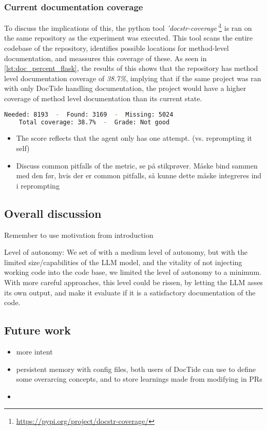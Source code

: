 \subsubsection*{Current documentation coverage}
To discuss the implications of this, the python tool \textit{'docstr-coverage'}\footnote{\url{https://pypi.org/project/docstr-coverage/}} is ran on the same repository as the experiment was executed. This tool scans the entire codebase of the repository, identifies possible locations for method-level documentation, and meassures this coverage of these. As seen in \cref{lst:doc_percent_flask}, the results of this shows that the repository has method level documentation coverage of \textit{38.7\%}, implying that if the same project was ran with only DocTide handling documentation, the project would have a higher coverage of method level documentation than its current state.

\begin{lstlisting}[language=sh, label={lst:doc_percent_flask},      caption= Ratio of method level documentation in flask repository]
    Needed: 8193  -  Found: 3169  -  Missing: 5024
    Total coverage: 38.7%  -  Grade: Not good
\end{lstlisting}
\begin{itemize}
    \item The score reflects that the agent only has one attempt. (vs. reprompting it self)
    \item Discuss common pitfalls of the metric, se på stikprøver. Måske bind sammen med den før, hvis der er common pitfalls, så kunne dette måske integreres ind i reprompting
\end{itemize}
\subsection{Overall discussion}
Remember to use motivation from introduction


Level of autonomy: We set of with a medium level of autonomy, but with the limited size/capabilities of the LLM model, and the vitality of not injecting working code into the code base, we limited the level of autonomy to a minimum. With more careful approaches, this level could be rissen, by letting the LLM asses its own output, and make it evaluate if it is a satisfactory documentation of the code.

\subsection{Future work}
\begin{itemize}
    \item more intent 
        \item persistent memory with config files, both users of DocTide can use to define some overarcing concepts, and to store learnings made from modifying in PRs
        \item 
\end{itemize}